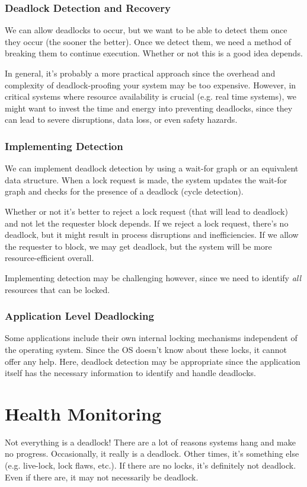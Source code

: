 \documentclass{report}
\begin{document}
\subsubsection{Deadlock Detection and Recovery}
We can allow deadlocks to occur, but we want to be able to detect them once they occur (the sooner
the better). Once we detect them, we need a method of breaking them to continue execution. Whether
or not this is a good idea depends.

In general, it's probably a more practical approach since the
overhead and complexity of deadlock-proofing your system may be too expensive. However, in critical
systems where resource availability is crucial (e.g. real time systems), we might want to invest the
time and energy into preventing deadlocks, since they can lead to severe disruptions, data loss, or
even safety hazards.


\subsubsection{Implementing Detection}
We can implement deadlock detection by using a wait-for graph or an equivalent data structure. When
a lock request is made, the system updates the wait-for graph and checks for the presence of a
deadlock (cycle detection).

Whether or not it's better to reject a lock request (that will lead to deadlock) and not let the
requester block depends. If we reject a lock request, there's no deadlock, but it might result in
process disruptions and inefficiencies. If we allow the requester to block, we may get deadlock, but
the system will be more resource-efficient overall. 

Implementing detection may be challenging however, since we need to identify \textit{all} resources
that can be locked.


\subsubsection{Application Level Deadlocking}
Some applications include their own internal locking mechanisms independent of the operating
system. Since the OS doesn't know about these locks, it cannot offer any help. Here, deadlock
detection may be appropriate since the application itself has the necessary information to identify
and handle deadlocks.


\section{Health Monitoring}
Not everything is a deadlock! There are a lot of reasons systems hang and make no
progress. Occasionally, it really is a deadlock. Other times, it's something else (e.g. live-lock,
lock flaws, etc.). If there are no locks, it's definitely not deadlock. Even if there are, it may
not necessarily be deadlock.
\end{document}
